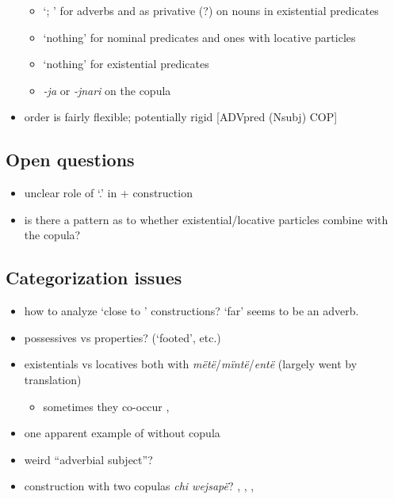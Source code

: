 \documentclass{memoir}
\begin{document}
\begin{itemize}
  \begin{itemize}
  \tightlist
  \item
     `; ' for adverbs and as privative (?) on
    nouns in existential predicates
  \item
     `nothing' for nominal predicates and ones with locative
    particles
  \item
     `nothing' for existential predicates
  \item
    \emph{-ja} or \emph{-jnari} on the copula
  \end{itemize}
\item
  order is fairly flexible; potentially rigid {[}ADVpred (Nsubj) COP{]}
\end{itemize}

\subsection{Open questions}

\begin{itemize}
\tightlist
\item
  unclear role of  `.' in 
  +  construction
\item
  is there a pattern as to whether existential/locative particles
  combine with the copula?
\end{itemize}

\subsection{Categorization issues}

\begin{itemize}
\tightlist
\item
  how to analyze `close to ' constructions?  `far'
  seems to be an adverb.
\item
  possessives vs properties? (`footed', etc.)
\item
  existentials vs locatives both with
  \emph{mëtë}/\emph{mïntë}/\emph{entë} (largely went by translation)

  \begin{itemize}
  \tightlist
  \item
    sometimes they co-occur ,
  \end{itemize}
\item
  one apparent example of  without copula
\item
  weird ``adverbial subject''? 
\item
  construction with two copulas \emph{chi wejsapë}?
  , ,
  , 
\end{itemize}
\end{document}
